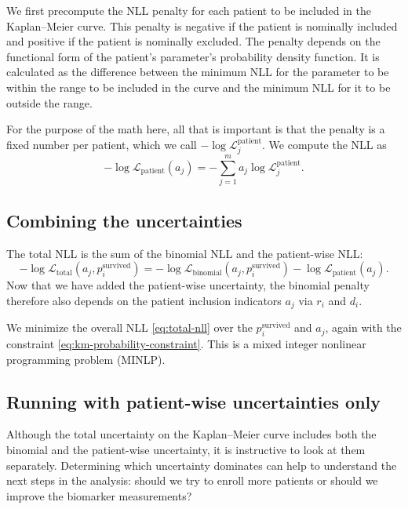 \documentclass[article]{jss}
\begin{document}
We first precompute the NLL penalty for each patient to be included in the Kaplan--Meier curve.  This penalty is negative if the patient is nominally included and positive if the patient is nominally excluded.  The penalty depends on the functional form of the patient's parameter's probability density function.  It is calculated as the difference between the minimum NLL for the parameter to be within the range to be included in the curve and the minimum NLL for it to be outside the range.

For the purpose of the math here, all that is important is that the penalty is a fixed number per patient, which we call \(-\log \mathcal{L}_j^{\text{patient}}\).  We compute the NLL as
\begin{equation}
-\log \mathcal{L}_{\text{patient}}(a_j) = -\sum_{j=1}^{m} a_j\log \mathcal{L}_j^{\text{patient}}. \label{eq:patient-nll}
\end{equation}

\subsection{Combining the uncertainties}

The total NLL is the sum of the binomial NLL and the patient-wise NLL:
\begin{equation}
-\log \mathcal{L}_{\text{total}}(a_j, p_i^\text{survived}) = -\log \mathcal{L}_{\text{binomial}}(a_j, p_i^\text{survived}) - \log \mathcal{L}_{\text{patient}}(a_j). \label{eq:total-nll}
\end{equation}
Now that we have added the patient-wise uncertainty, the binomial penalty therefore also depends on the patient inclusion indicators \(a_j\) via \(r_i\) and \(d_i\).

We minimize the overall NLL \cref{eq:total-nll} over the \(p_i^\text{survived}\) and \(a_j\), again with the constraint \cref{eq:km-probability-constraint}.  This is a mixed integer nonlinear programming problem (MINLP).

\subsection{Running with patient-wise uncertainties only}

Although the total uncertainty on the Kaplan--Meier curve includes both the binomial and the patient-wise uncertainty, it is instructive to look at them separately.  Determining which uncertainty dominates can help to understand the next steps in the analysis: should we try to enroll more patients or should we improve the biomarker measurements?
\end{document}
